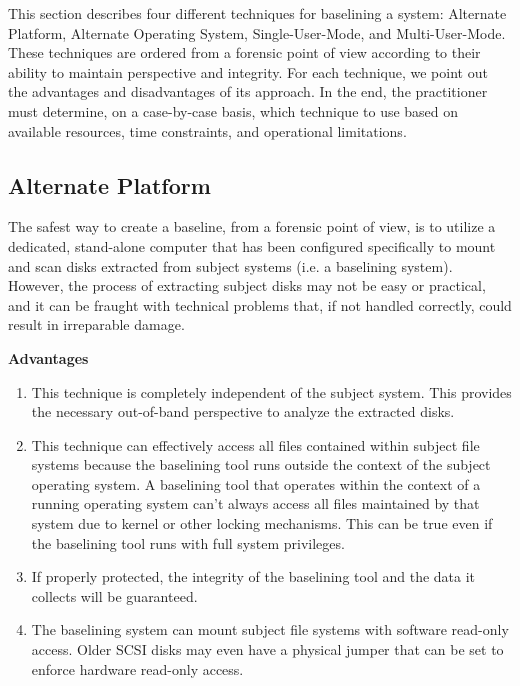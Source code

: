 \documentclass[10pt]{article}
\begin{document}
This section describes four different techniques for baselining a
system: Alternate Platform, Alternate Operating System, Single-User-Mode,
and Multi-User-Mode.  These techniques are ordered from a forensic
point of view according to their ability to maintain perspective
and integrity.  For each technique, we point out the advantages
and disadvantages of its approach.  In the end, the practitioner
must determine, on a case-by-case basis, which technique to use
based on available resources, time constraints, and operational
limitations.

\subsection{Alternate Platform}

The safest way to create a baseline, from a forensic point of view,
is to utilize a dedicated, stand-alone computer that has been
configured specifically to mount and scan disks extracted from
subject systems (i.e. a baselining system).  However, the process
of extracting subject disks may not be easy or practical, and it
can be fraught with technical problems that, if not handled correctly,
could result in irreparable damage.

  \textbf{Advantages}

\begin{enumerate}

  \item
  This technique is completely independent of the subject system.
  This provides the necessary out-of-band perspective to analyze
  the extracted disks.

  \item 
  This technique can effectively access all files contained within
  subject file systems because the baselining tool runs outside
  the context of the subject operating system.  A baselining tool
  that operates within the context of a running operating system
  can't always access all files maintained by that system due to
  kernel or other locking mechanisms.  This can be true even if
  the baselining tool runs with full system privileges.

  \item
  If properly protected, the integrity of the baselining tool and
  the data it collects will be guaranteed.

  \item
  The baselining system can mount subject file systems with software
  read-only access.  Older SCSI disks may even have a physical
  jumper that can be set to enforce hardware read-only access.

\end{enumerate}
\end{document}
